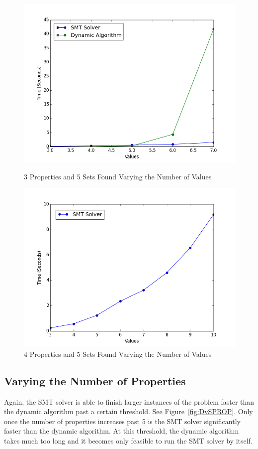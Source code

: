 \documentclass[pageno]{jpaper}
\begin{document}
\begin{figure}[htbb]
\begin{minipage}[b]{0.5\linewidth}
\centering
\includegraphics[width=.75\linewidth]{DvSVAL-v34567p3n5.png}
\caption{3 Properties and 5 Sets Found Varying the Number of Values}
\label{fig:DvSVAL}
\end{minipage}
\hspace{0.5cm}
\begin{minipage}[b]{0.5\linewidth}
\centering
\includegraphics[width=.75\linewidth]{SMTOnlyVAL-v345678910p4n5.png}
\caption{4 Properties and 5 Sets Found Varying the Number of Values}
\label{fig:SMTVal}
\end{minipage}
\end{figure}



\subsection{Varying the Number of Properties}

Again, the SMT solver is able to finish larger instances of the problem faster than the dynamic algorithm past a certain threshold. See Figure~\ref{fig:DvSPROP}. Only once the number of properties increases past 5 is the SMT solver significantly faster than the dynamic algorithm. At this threshold, the dynamic algorithm takes much too long and it becomes only feasible to run the SMT solver by itself. 
\end{document}
